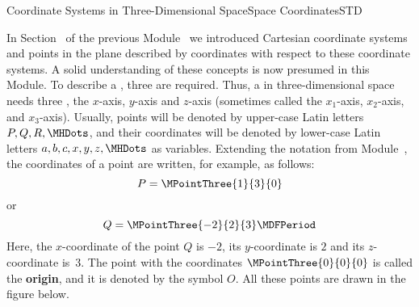 \begin{MXContent}{Coordinate Systems in Three-Dimensional Space}{Space Coordinates}{STD}

In Section~ of the previous Module~ we introduced Cartesian coordinate systems
and points in the plane described by coordinates with respect to these coordinate systems. A solid understanding
of these concepts is now presumed in this Module. To describe a ,
three  are required. Thus, a 
 in three-dimensional space needs 
three , the $x$-axis, $y$-axis and $z$-axis 
(sometimes called the $x_1$-axis, $x_2$-axis, and $x_3$-axis). Usually, points will be denoted by 
upper-case Latin letters $P,Q,R,\MHDots$, and their coordinates will be denoted by lower-case Latin letters 
$a,b,c,x,y,z,\MHDots$ as variables. Extending the notation from Module~, the coordinates of a 
point are written, for example, as follows:
\[
 P=\MPointThree{1}{3}{0}
\]
or
\[
 Q=\MPointThree{-2}{2}{3}\MDFPeriod
\]
Here, the $x$-coordinate of the point $Q$ is $-2$, its $y$-coordinate is $2$ and its $z$-coordinate is~$3$.
The point with the coordinates $\MPointThree{0}{0}{0}$ is called the \textbf{origin}, and it is denoted by the symbol
$O$. All these points are drawn in the figure below.


\end{MXContent}
